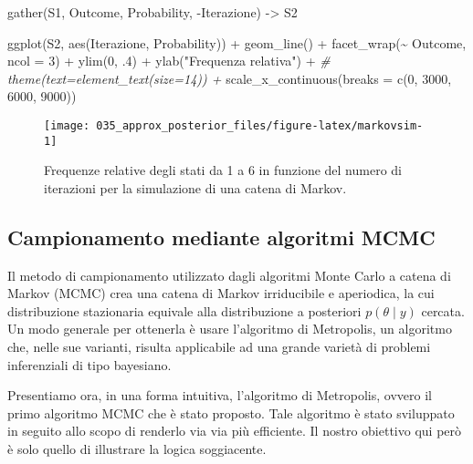 \documentclass[
]{memoir}
\newenvironment{Shaded}{\begin{snugshade}}{\end{snugshade}}
\newcommand{\AttributeTok}[1]{\textcolor[rgb]{0.77,0.63,0.00}{#1}}
\newcommand{\CommentTok}[1]{\textcolor[rgb]{0.56,0.35,0.01}{\textit{#1}}}
\newcommand{\DecValTok}[1]{\textcolor[rgb]{0.00,0.00,0.81}{#1}}
\newcommand{\FunctionTok}[1]{\textcolor[rgb]{0.00,0.00,0.00}{#1}}
\newcommand{\NormalTok}[1]{#1}
\newcommand{\OtherTok}[1]{\textcolor[rgb]{0.56,0.35,0.01}{#1}}
\newcommand{\SpecialCharTok}[1]{\textcolor[rgb]{0.00,0.00,0.00}{#1}}
\newcommand{\StringTok}[1]{\textcolor[rgb]{0.31,0.60,0.02}{#1}}
\begin{document}
\begin{Shaded}
\begin{Highlighting}[]
\FunctionTok{gather}\NormalTok{(S1, Outcome, Probability, }\SpecialCharTok{{-}}\NormalTok{Iterazione) }\OtherTok{{-}\textgreater{}}\NormalTok{ S2}

\FunctionTok{ggplot}\NormalTok{(S2, }\FunctionTok{aes}\NormalTok{(Iterazione, Probability)) }\SpecialCharTok{+}
  \FunctionTok{geom\_line}\NormalTok{() }\SpecialCharTok{+}
  \FunctionTok{facet\_wrap}\NormalTok{(}\SpecialCharTok{\textasciitilde{}}\NormalTok{ Outcome, }\AttributeTok{ncol =} \DecValTok{3}\NormalTok{) }\SpecialCharTok{+}
  \FunctionTok{ylim}\NormalTok{(}\DecValTok{0}\NormalTok{, .}\DecValTok{4}\NormalTok{) }\SpecialCharTok{+}
  \FunctionTok{ylab}\NormalTok{(}\StringTok{"Frequenza relativa"}\NormalTok{) }\SpecialCharTok{+}
  \CommentTok{\# theme(text=element\_text(size=14))  +}
  \FunctionTok{scale\_x\_continuous}\NormalTok{(}\AttributeTok{breaks =} \FunctionTok{c}\NormalTok{(}\DecValTok{0}\NormalTok{, }\DecValTok{3000}\NormalTok{, }\DecValTok{6000}\NormalTok{, }\DecValTok{9000}\NormalTok{))}
\end{Highlighting}
\end{Shaded}

\begin{figure}

{\centering \texttt{[image: 035\_approx\_posterior\_files/figure-latex/markovsim-1]} 

}

\caption{Frequenze relative degli stati da 1 a 6 in funzione del numero di iterazioni per la simulazione di una catena di Markov.}\label{fig:markovsim}
\end{figure}

\hypertarget{campionamento-mediante-algoritmi-mcmc}{%
\subsection{Campionamento mediante algoritmi MCMC}\label{campionamento-mediante-algoritmi-mcmc}}

Il metodo di campionamento utilizzato dagli algoritmi Monte Carlo a catena di Markov (MCMC) crea una catena di Markov irriducibile e aperiodica, la cui distribuzione stazionaria equivale alla distribuzione a posteriori \(p(\theta \mid y)\) cercata. Un modo generale per ottenerla è usare l'algoritmo di Metropolis, un algoritmo che, nelle sue varianti, risulta applicabile ad una grande varietà di problemi inferenziali di tipo bayesiano.

Presentiamo ora, in una forma intuitiva, l'algoritmo di Metropolis, ovvero il primo algoritmo MCMC che è stato proposto. Tale algoritmo è stato sviluppato in seguito allo scopo di renderlo via via più efficiente. Il nostro obiettivo qui però è solo quello di illustrare la logica soggiacente.
\end{document}
